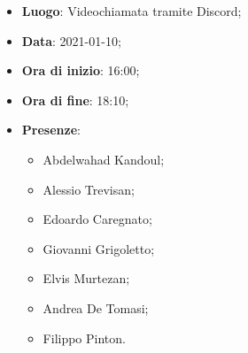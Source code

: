 \begin{itemize}
    \item \textbf{Luogo}: Videochiamata tramite Discord;
    \item \textbf{Data}: 2021-01-10;
    \item \textbf{Ora di inizio}: 16:00;
    \item \textbf{Ora di fine}: 18:10;
    \item \textbf{Presenze}:
          \begin{itemize}
            \item Abdelwahad Kandoul;
            \item Alessio Trevisan;
            \item Edoardo Caregnato;
            \item Giovanni Grigoletto;
            \item Elvis Murtezan;
            \item Andrea De Tomasi;
            \item Filippo Pinton.
          \end{itemize}
\end{itemize}